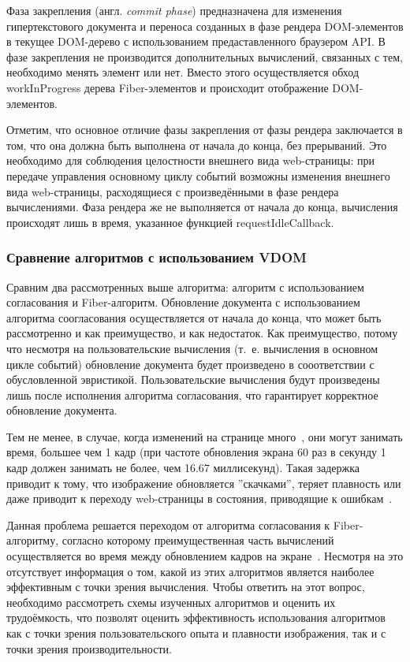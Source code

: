 
Фаза закрепления (англ. \textit{commit phase}) предназначена для изменения гипертекстового документа и переноса созданных в фазе рендера DOM-элементов в текущее DOM-дерево с использованием предаставленного браузером API.
В фазе закрепления не производится дополнительных вычислений, связанных с тем, необходимо менять элемент или нет.
Вместо этого осуществляется обход workInProgress дерева Fiber-элементов и происходит отображение DOM-элементов.

Отметим, что основное отличие фазы закрепления от фазы рендера заключается в том, что она должна быть выполнена от начала до конца, без прерываний. Это необходимо для соблюдения целостности внешнего вида web-страницы: при передаче управления основному циклу событий возможны изменения внешнего вида web-страницы, расходящиеся с произведёнными в фазе рендера вычислениями. Фаза рендера же не выполняется от начала до конца, вычисления происходят лишь в время, указанное функцией requestIdleCallback.

\subsubsection{Сравнение алгоритмов с использованием VDOM}

Сравним два рассмотренных выше алгоритма: алгоритм с использованием согласования и Fiber-алгоритм. Обновление документа с использованием алгоритма соогласования осуществляется от начала до конца, что может быть рассмотренно и как преимущество, и как недостаток. Как преимущество, потому что несмотря на пользовательские вычисления (т.~е. вычисления в основном цикле событий) обновление документа будет произведено в сооответствии с обусловленной эвристикой. Пользовательские вычисления будут произведены лишь после исполнения алгоритма согласования, что гарантирует корректное обновление документа.

Тем не менее, в случае, когда изменений на странице много~\cite{react-dive}, они могут занимать время, большее чем 1 кадр (при частоте обновления экрана 60 раз в секунду 1 кадр должен занимать не более, чем 16.67 миллисекунд). Такая задержка приводит к тому, что изображение обновляется ''скачками'', теряет плавность или даже приводит к переходу web-страницы в состояния, приводящие к ошибкам~\cite{fiber}. 

 Данная проблема решается переходом от алгоритма согласования к Fiber-алгоритму, согласно которому преимущественная часть вычислений осуществляется во время между обновлением кадров на экране~\cite{requestidlecallback}. 
Несмотря на это отсутствует информация о том, какой из этих алгоритмов является наиболее эффективным с точки зрения вычисления.
Чтобы ответить на этот вопрос, необходимо рассмотреть схемы изученных алгоритмов и оценить их трудоёмкость, что позволят оценить эффективность использования алгоритмов как с точки зрения пользовательского опыта и плавности изображения, так и с точки зрения производительности.

